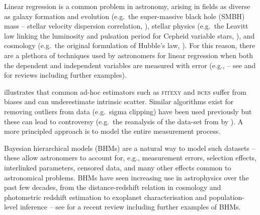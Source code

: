 \documentclass[fleqn,usenatbib]{rasti}
\begin{document}








Linear regression is a common problem in astronomy, arising in fields as diverse
as galaxy formation and evolution (e.g.\ the super-massive black hole (SMBH)
mass -- stellar velocity dispersion correlation, \citealt{Ferrarese:2000,
Gebhardt:2000}), stellar physics (e.g.\ the Leavitt law linking the luminosity
and pulsation period for Cepheid variable stars, \citealt{Leavitt:1912}), and
cosmology (e.g.\ the original formulation of Hubble's law,
\citealt{Hubble:1929}). For this reason, there are a plethora of techniques used
by astronomers for linear regression when both the dependent and independent
variables are measured with error (e.g., \citealt{Press:1992, Akritas:1996,
Tremaine:2002, Kelly:2007} -- see \citealt{Andreon:2013} and
\citealt{Andreon:2015} for reviews including further examples).

\citet{Kelly:2007} illustrates that common ad-hoc estimators such as
\textsc{fitexy} \citep{Press:1992, Tremaine:2002} and \textsc{bces}
\citep{Akritas:1996} suffer from biases and can underestimate intrinsic scatter.
Similar algorithms exist for removing outliers from data (e.g.\ sigma clipping)
have been used previously but these can lead to controversy (e.g.\ the
reanalysis of the data-set from \citealt{Riess:2011} by
\citealt{Efstathiou:2014}). A more principled approach is to model the entire
measurement process.

Bayesian hierarchical models (BHMs) are a natural way to model such datasets --
these allow astronomers to account for, e.g., measurement errors, selection
effects, interlinked parameters, censored data, and many other effects common to
astronomical problems. BHMs have seen increasing use in astrophysics over the
past few decades, from the distance-redshift relation in cosmology
\citep[e.g.][]{Feeney:2018, Avelino:2019} and photometric redshift estimation
\citep[e.g.][]{Leistedt:2016} to exoplanet characterisation
\citep[e.g.][]{Sestovic:2018} and population-level inference
\citep[e.g.][]{Kelly:2009} -- see \citet{Feigelson:2021} for a recent review
including further examples of BHMs.
\end{document}
